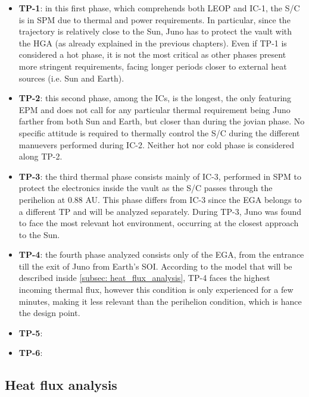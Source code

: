 \begin{itemize}
    \item \textbf{TP-1}:
    in this first phase, which comprehends both LEOP and IC-1, the S/C is in SPM due to thermal and power requirements. In particular, since the trajectory is relatively close to the Sun, Juno has to protect the vault with the HGA (as already explained in the previous chapters).
    Even if TP-1 is considered a hot phase, it is not the most critical as other phases present more stringent requirements, facing longer periods closer to external heat sources (i.e. Sun and Earth). 
    \item \textbf{TP-2}: 
    this second phase, among the ICs, is the longest, the only featuring EPM and does not call for any particular thermal requirement being Juno farther from both Sun and Earth, but closer than during the jovian phase. No specific attitude is required to thermally control the S/C  during the different manuevers performed during IC-2. Neither hot nor cold phase is considered along TP-2.    
    
    \item \textbf{TP-3}:
    the third thermal phase consists mainly of IC-3, performed in SPM to protect the electronics inside the vault as the S/C passes through the perihelion at 0.88 AU. This phase differs from IC-3 since the EGA belongs to a different TP and will be analyzed separately. During TP-3, Juno was found to face the most relevant hot environment, occurring at the closest approach to the Sun.  %
      
    \item \textbf{TP-4}: 
    the fourth phase analyzed consists only of the EGA, from the entrance till the exit of Juno from Earth's SOI. According to the model that will be described inside \autoref{subsec: heat_flux_analysis}, TP-4 faces the highest incoming thermal flux, 
    however this condition is only experienced for a few minutes, making it less relevant than the perihelion condition, which is hance the design point.    
    
    \item \textbf{TP-5}: 
    
    
    \item \textbf{TP-6}:
    
    
\end{itemize}

\subsection{Heat flux analysis}
\label{subsec: heat_flux_analysis}